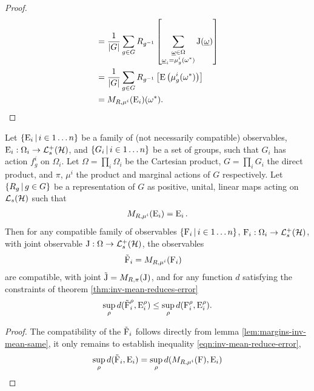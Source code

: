 \begin{lem}
\begin{proof}
\begin{align}
                               &= \frac{1}{{\left\lvert{G}\right\rvert}}\sum_{g\in G} R_{g^{-1}}\left[\sum_{\substack{\underline{\omega} \in \Omega\\ \underline{\omega}_i = \mu^i_{g}(\omega^*)}} \operatorname{J}(\underline{\omega})\right]\\
                               &= \frac{1}{{\left\lvert{G}\right\rvert}}\sum_{g\in G} R_{g^{-1}}\left[\operatorname{E}\left(\mu^i_{g}(\omega^*)\right)\right]\\
                               &= M_{R, \mu^i}(\operatorname{E}_i)(\omega^*).
    \end{align}
  \end{proof}
\end{lem}

\begin{thm}
  \label{thm:cov-obs-improve-approx}
  Let $\left\{\operatorname{E}_i\,\middle|\, i\in 1\hdots n\right\}$ be a family of (not necessarily compatible) observables, $\ope_i:\Omega_i \to \posops[\hcal]$, and $\left\{G_i\,\middle|\,i\in 1\hdots n\right\}$ be a set of groups, such that $G_i$ has action $f_g^i$ on $\Omega_i$. Let $\Omega = \prod_i \Omega_i$ be the Cartesian product, $G = \prod_i G_i$ the direct product, and $\pi$, $\mu^i$ the product and marginal actions of $G$ respectively. Let $\left\{R_g\,\middle|\,g\in G\right\}$ be a representation of $G$ as positive, unital, linear maps acting on $\saops[\hcal]$ such that
  \begin{align}
    M_{R,\mu^i}(\operatorname{E}_i) = \operatorname{E}_i.
  \end{align}
  Then for any compatible family of observables $\left\{\operatorname{F}_i\,\middle|\, i\in 1\hdots n\right\}$, $\opf_i:\Omega_i \to \posops[\hcal]$, with joint observable $\opj:\Omega\to\posops[\hcal]$, the observables
  \begin{align}
    \tilde{\operatorname{F}}_i &= M_{R, \mu^i}(\operatorname{F}_i)
  \end{align}
  are compatible, with joint $\tilde{\operatorname{J}} = M_{R, \pi}(\operatorname{J})$, and for any function $d$ satisfying the constraints of theorem \ref{thm:inv-mean-reduces-error}
  \begin{align}
    \label{eqn:inv-mean-reduce-error}
    \sup_\rho d(\tilde{\operatorname{F}}^\rho_i, \operatorname{E}_i^\rho) \leq \sup_\rho d(\operatorname{F}_i^\rho, \operatorname{E}_i^\rho).
  \end{align}
  \begin{proof}
    The compatibility of the $\tilde{\operatorname{F}}_i$ follows directly from lemma \ref{lem:margins-inv-mean-same}, it only remains to establish inequality \eqref{eqn:inv-mean-reduce-error},
    \begin{align}
      \sup_\rho  d(\tilde{\opf}_i, \ope_i) &= \sup_\rho d(M_{R, \mu^i}(\opf), \ope_i)\\

\end{align}
\end{proof}
\end{thm}
